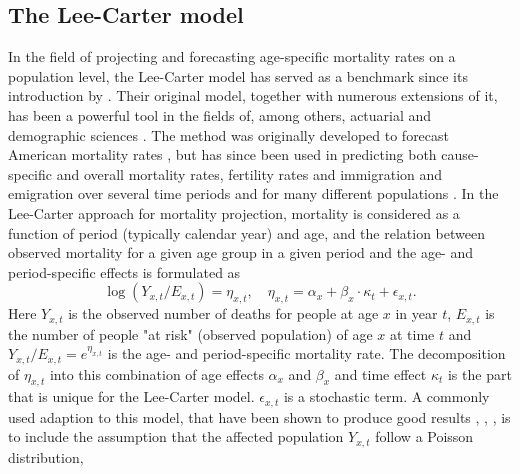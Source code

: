 \subsection{The Lee-Carter model}
\label{section:Lee-Carter}
In the field of projecting and forecasting age-specific mortality rates on a population level, the Lee-Carter model has served as a benchmark since its introduction by \textcite{LeeCarter1992}. Their original model, together with numerous extensions of it, has been a powerful tool in the fields of, among others, actuarial and demographic sciences \parencite{booth_tickle_2008}. The method was originally developed to forecast American mortality rates \parencite{LeeCarter1992}, but has since been used in predicting both cause-specific and overall mortality rates, fertility rates and immigration and emigration over several time periods and for many different populations \parencite{GirosiKing2007}. 
\newline
\noindent In the Lee-Carter approach for mortality projection, mortality is considered as a function of period (typically calendar year) and age, and the relation between observed mortality for a given age group in a given period and the age- and period-specific effects is formulated as 
\begin{equation}
\log(Y_{x,t}/E_{x,t})  = \eta_{x,t}, \quad \eta_{x,t}= \alpha_x + \beta_x\cdot\kappa_t + \epsilon_{x,t}.
\label{eq:orig-LC-model}
\end{equation}
Here $Y_{x,t}$ is the observed number of deaths for people at age $x$ in year $t$, $E_{x,t}$ is the number of people "at risk" (observed population) of age $x$ at time $t$ and $Y_{x,t}/E_{x,t} = e^{\eta_{x,t}}$ is the age- and period-specific mortality rate. The decomposition of $\eta_{x,t}$ into this combination of age effects $\alpha_x$ and $\beta_x$ and time effect $\kappa_t$ is the part that is unique for the Lee-Carter model. $\epsilon_{x,t}$ is a stochastic term.
\newpar A commonly used adaption to this model, that have been shown to produce good results \parencite{CZADO2005260}, \parencite{Wisniowski2015}, \parencite{BROUHNS2002373}, is to include the assumption that the affected population $Y_{x,t}$ follow a Poisson distribution,
